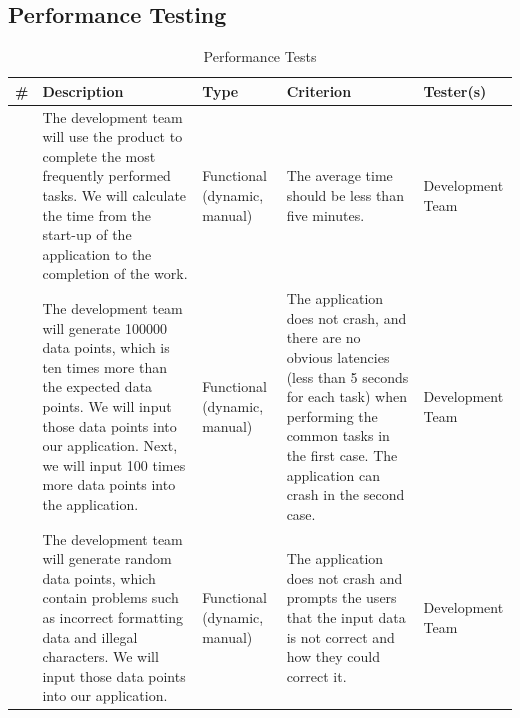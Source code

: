 \documentclass[12pt]{article}
\newcounter{TestCounter}
\begin{document}
\subsection{Performance Testing}
\begin{center}
	\begin{longtable}{c>{\raggedright\arraybackslash}p{4.8cm} >{\raggedright\arraybackslash}p{3.5cm}>{\raggedright\arraybackslash}p{3cm}>{\raggedright\arraybackslash}p{3cm}}
		\caption{Performance Tests}\label{Performance Tests}\\
		\toprule
		\bf \# & \bf Description & \bf Type & \bf Criterion & Tester(s) \\\midrule
		\stepcounter{TestCounter}\arabic{TestCounter} 
		& The development team will use the product to complete the most frequently performed tasks.
		We will calculate the time from the start-up of the application to the completion of the work.
		& Functional (dynamic, manual)	
		& The average time should be less than five minutes.  
		& 	Development Team
		\\\midrule
		\stepcounter{TestCounter}\arabic{TestCounter} 
		& The development team will generate 100000 data points, which is ten times more
		than the expected data points. We will input those data points into our
		application. Next, we will input 100 times more data points into the application.
		& Functional (dynamic, manual)	
		& The application does not crash, and there are no obvious latencies
		(less than 5 seconds for each task) when performing
		the common tasks in the first case. The application can crash in the second case.  
		& 	Development Team
		\\\midrule
		\stepcounter{TestCounter}\arabic{TestCounter} 
		& The development team will generate random data points, which contain problems such as
		incorrect formatting data and illegal characters. We will input those data points into
		our application.
		& Functional (dynamic, manual)	
		& The application does not crash and prompts the users that the input data is not
		correct and how they could correct it.  
		& 	Development Team
		\\\midrule
		\bottomrule
	\end{longtable}
\end{center}


\end{document}
